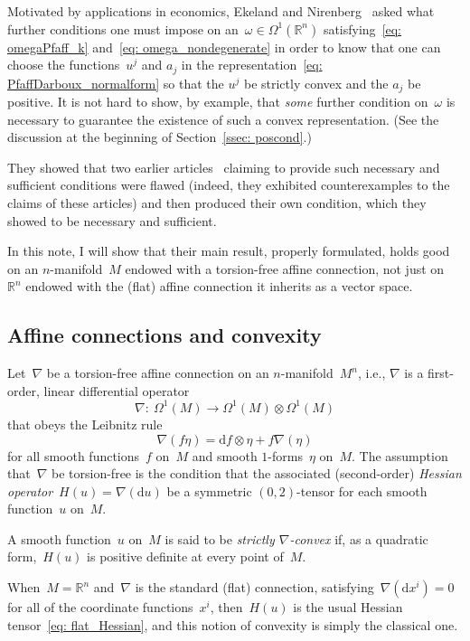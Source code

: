 \documentclass[11pt]{article}
\numberwithin{equation}{section}
\renewcommand{\d}{\mathrm{d}}%
\newcommand{\bbR}{{\mathbb R}}
\numberwithin{equation}{section}
\begin{document}
Motivated by applications in economics,
Ekeland and Nirenberg~\cite{MR2023129}
asked what further conditions one must impose on an~$\omega\in\Omega^1(\bbR^n)$
satisfying~\eqref{eq: omegaPfaff_k} and~\eqref{eq: omega_nondegenerate}
in order to know that one can choose the functions~$u^j$
and $a_j$ in the representation~\eqref{eq: PfaffDarboux_normalform}
so that the $u^j$ be strictly convex and the $a_j$ be positive.
It is not hard to show, by example, that \emph{some}
further condition on~$\omega$ is necessary
to guarantee the existence of such a convex representation.
(See the discussion at the beginning of Section~\ref{ssec: poscond}.)

They showed that two earlier articles~\cite{MR1655519,MR1652709}
claiming to provide such necessary and sufficient conditions were flawed
(indeed, they exhibited counterexamples to the claims of these articles)
and then produced their own condition,
which they showed to be necessary and sufficient.

In this note, I will show that their main result,
properly formulated, holds good on an $n$-manifold~$M$
endowed with a torsion-free affine connection,
not just on~$\bbR^n$ endowed with the (flat) affine connection
it inherits as a vector space.

\subsection{Affine connections and convexity}

Let~$\nabla$ be a torsion-free affine connection on an $n$-manifold~$M^n$,
i.e., $\nabla$ is a first-order, linear differential operator
\begin{equation*}
\nabla \colon \ \Omega^1(M)\to \Omega^1(M)\otimes \Omega^1(M)
\end{equation*}
that obeys the Leibnitz rule
\begin{equation*}
\nabla (f\eta) = \d f\otimes\eta + f \nabla(\eta)
\end{equation*}
for all smooth functions~$f$ on~$M$ and smooth $1$-forms~$\eta$ on~$M$.
The assumption that~$\nabla$ be torsion-free
is the condition that the associated (second-order)
\emph{Hessian operator}~$H(u)=\nabla(\d u)$
be a symmetric $(0,2)$-tensor for each smooth function~$u$ on~$M$.

A smooth function~$u$ on~$M$ is said to be {\it strictly $\nabla$-convex}
if, as a quadratic form,~$H(u)$ is positive definite at every point of~$M$.

When~$M=\bbR^n$ and~$\nabla$ is the standard (flat) connection,
satisfying~$\nabla(\d x^i) = 0$ for all of the coordinate functions~$x^i$,
then~$H(u)$ is the usual Hessian tensor~\eqref{eq: flat_Hessian},
and this notion of convexity is simply the classical one.
\end{document}
